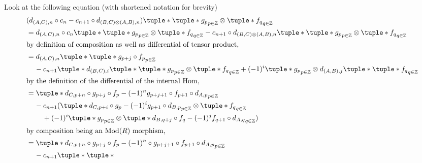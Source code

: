 \begin{remark}
\begin{enumerate}
{            Look at the following equation (with shortened notation for brevity) 
            \begin{align*}
                &( d_{(A, C), n} \circ c_n - c_{n + 1} \circ d_{(B, C) \otimes (A, B), n} )\tuple*{ \tuple*{ g_p }_{p \in \Zb} \otimes \tuple*{ f_q }_{q \in \Zb} } \\
                &= d_{(A, C), n} \circ c_n \tuple*{ \tuple*{ g_p }_{p \in \Zb} \otimes \tuple*{ f_q }_{q \in \Zb} } - c_{n + 1} \circ d_{(B, C) \otimes (A, B), n}\tuple*{ \tuple*{ g_p }_{p \in \Zb} \otimes \tuple*{ f_q }_{q \in \Zb} } \\
                \intertext{by definition of composition as well as differential of tensor product,}
                &= d_{(A, C), n}\tuple*{
                    \tuple*{ g_{p + j} \circ f_p }_{p \in \Zb}
                } \\
                &\hspace{0.4cm} - c_{n + 1} \tuple*{
                    d_{(B, C), i}\tuple*{ \tuple*{ g_p }_{p \in \Zb} } \otimes \tuple*{ f_q }_{q \in \Zb}
                    + (-1)^i \tuple*{ g_p }_{p \in \Zb} \otimes d_{(A, B), j} \tuple*{ \tuple*{ f_q }_{q \in \Zb} }
                } \\
                \intertext{by the definition of the differential of the internal Hom,}
                &= \tuple*{
                    d_{C, p + n} \circ g_{p + j} \circ f_p - (-1)^n g_{p + j + 1} \circ f_{p + 1} \circ d_{A, p}
                }_{p \in \Zb} \\
                &\hspace{0.4cm} - c_{n + 1} (
                    \tuple*{
                        d_{C, p + i} \circ g_p - (-1)^i g_{p + 1} \circ d_{B, p}
                    }_{p \in \Zb} \otimes \tuple*{ f_q }_{q \in \Zb} \\
                    &\hspace{0.8cm}+ (-1)^i \tuple*{ g_p }_{p \in \Zb} \otimes \tuple*{
                        d_{B, q + j} \circ f_q - (-1)^j f_{q + 1} \circ d_{A, q}
                    }_{q \in \Zb}
                ) \\
                \intertext{by composition being an \( \Mod(R) \) morphism,}
                &= \tuple*{
                    d_{C, p + n} \circ g_{p + j} \circ f_p - (-1)^n \circ g_{p + j + 1} \circ f_{p + 1} \circ d_{A, p}
                }_{p \in \Zb} \\
                &\hspace{0.4cm} - c_{n + 1} \tuple*{
                    \tuple*{
}}
\end{align*}}
\end{enumerate}
\end{remark}
